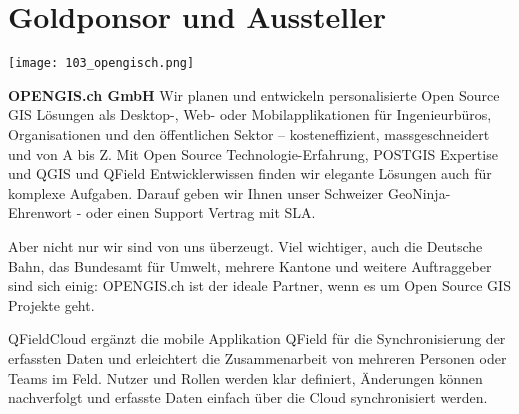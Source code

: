 \section*{Goldponsor und Aussteller}
\begin{flushright}
\texttt{[image: 103\_opengisch.png]}
\end{flushright}
\noindent
{\bfseries OPENGIS.ch GmbH} Wir planen und entwickeln personalisierte Open Source GIS Lösungen als Desktop-, Web- oder Mobilapplikationen für Ingenieurbüros, Organisationen und den öffentlichen Sektor – kosteneffizient, massgeschneidert und von A bis Z. Mit Open Source Technologie-Erfahrung, POSTGIS Expertise und QGIS und QField Entwicklerwissen finden wir elegante Lösungen auch für komplexe Aufgaben. Darauf geben wir Ihnen unser Schweizer GeoNinja-Ehrenwort - oder einen Support Vertrag mit SLA.

\noindent
Aber nicht nur wir sind von uns überzeugt. Viel wichtiger, auch die Deutsche Bahn, das Bundesamt für Umwelt, mehrere Kantone und weitere Auftraggeber sind sich einig: OPENGIS.ch ist der ideale Partner, wenn es um Open Source GIS Projekte geht.

\noindent
QFieldCloud ergänzt die mobile Applikation QField für die Synchronisierung der erfassten Daten und erleichtert die Zusammenarbeit von mehreren Personen oder Teams im Feld. Nutzer und Rollen werden klar definiert, Änderungen können nachverfolgt und erfasste Daten einfach über die Cloud synchronisiert werden.

